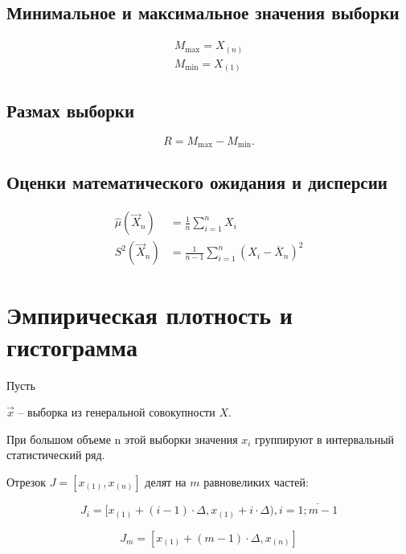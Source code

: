 \documentclass[12pt]{report}
\begin{document}
\subsection{Минимальное и максимальное значения выборки}
\begin{equation}
    \begin{aligned}
        M_{\max} = X_{(n)}\\
        M_{\min} = X_{(1)}
    \end{aligned}
\end{equation}

\subsection{Размах выборки}
\begin{equation}
    R = M_{\max} - M_{\min}.
\end{equation}

\subsection{Оценки математического ожидания и дисперсии}
\begin{equation}
    \begin{aligned}
    \hat\mu(\vec X_n) &= \frac 1n \sum_{i=1}^n X_i\\
    S^2(\vec X_n) &= \frac 1{n-1} \sum_{i=1}^n (X_i-\overline X_n)^2
    \end{aligned}
\end{equation}

\section{Эмпирическая плотность и гистограмма}

Пусть 

$\vec x$ -- выборка из генеральной совокупности $X$. 

При большом объеме n этой выборки  значения $x_i$ группируют в интервальный статистический ряд. 

Отрезок $J = [x_{(1)}, x_{(n)}]$ делят на $m$ равновеликих частей:

\begin{equation}
    J_i = [x_{(1)} + (i - 1) \cdot \Delta, x_{(1)} + i \cdot \Delta), i = \overline{1; m - 1}
\end{equation}

\begin{equation}
    J_{m} = [x_{(1)} + (m - 1) \cdot \Delta, x_{(n)}]
\end{equation}
\end{document}
